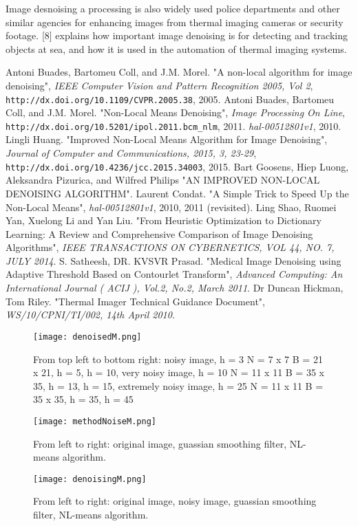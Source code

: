 \documentclass[11pt, twocolumn]{article}
\begin{document}
Image desnoising a processing is also widely used police departments and other similar agencies for enhancing images from thermal imaging cameras or security footage. [8] explains how important image denoising is for detecting and tracking objects at sea, and how it is used in the automation of thermal imaging systems.
\begin{thebibliography}{8}
Antoni Buades, Bartomeu Coll, and J.M. Morel.
"A non-local algorithm for image denoising",
\textit{IEEE Computer Vision and Pattern Recognition 2005, Vol 2}, \texttt{http://dx.doi.org/10.1109/CVPR.2005.38}, 2005.
Antoni Buades, Bartomeu Coll, and J.M. Morel.
"Non-Local Means Denoising",
\textit{Image Processing On Line}, \texttt{http://dx.doi.org/10.5201/ipol.2011.bcm\_nlm}, 2011.
\textit{hal-00512801v1}, 2010.
Lingli Huang.
"Improved Non-Local Means Algorithm for Image Denoising",
\textit{Journal of Computer and Communications, 2015, 3, 23-29}, \texttt{http://dx.doi.org/10.4236/jcc.2015.34003}, 2015.
Bart Goosens, Hiep Luong, Aleksandra Pizurica, and Wilfred Philips
"AN IMPROVED NON-LOCAL DENOISING ALGORITHM".
Laurent Condat. 
"A Simple Trick to Speed Up the Non-Local Means", 
\textit{hal-00512801v1}, 2010, 2011 (revisited).
Ling Shao,  Ruomei Yan, Xuelong Li and Yan Liu.
"From Heuristic Optimization to Dictionary Learning: A Review and Comprehensive Comparison of Image Denoising Algorithms",
\textit{IEEE TRANSACTIONS ON CYBERNETICS, VOL 44, NO. 7, JULY 2014}.
S. Satheesh, DR. KVSVR Prasad.
"Medical Image Denoising using Adaptive Threshold Based on Contourlet Transform",
\textit{Advanced Computing: An International Journal ( ACIJ ), Vol.2, No.2, March 2011}.
Dr Duncan Hickman, Tom Riley.
"Thermal Imager Technical Guidance Document",
\textit{WS/10/CPNI/TI/002, 14th April 2010}.
\end{thebibliography}
\newpage
\onecolumn
\begin{appendices}
\begin{figure}[h!]
\texttt{[image: denoisedM.png]}
\caption{From top left to bottom right: noisy image, h = 3 N = 7 x 7 B = 21 x 21, h = 5, h = 10, very noisy image, h = 10 N = 11 x 11 B = 35 x 35, h = 13, h = 15, extremely noisy image, h = 25 N = 11 x 11 B = 35 x 35, h = 35, h = 45}
\end{figure}
\begin{center}
\begin{figure}[h!]
\texttt{[image: methodNoiseM.png]}
\caption{From left to right: original image, guassian smoothing filter, NL-means algorithm.}
\end{figure}
\end{center}
\begin{figure}[h!]
\texttt{[image: denoisingM.png]}
\caption{From left to right: original image, noisy image, guassian smoothing filter, NL-means algorithm.}
\end{figure}

\end{appendices}
\end{document}
